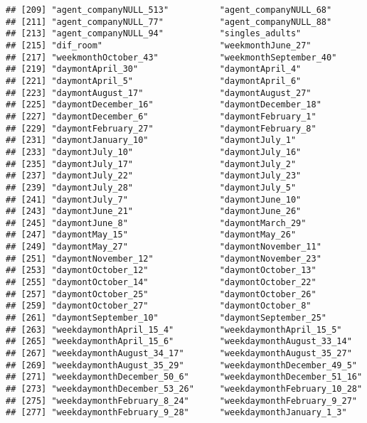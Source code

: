 \documentclass[
]{book}
\begin{document}
\begin{verbatim}
## [209] "agent_companyNULL_513"          "agent_companyNULL_68"          
## [211] "agent_companyNULL_77"           "agent_companyNULL_88"          
## [213] "agent_companyNULL_94"           "singles_adults"                
## [215] "dif_room"                       "weekmonthJune_27"              
## [217] "weekmonthOctober_43"            "weekmonthSeptember_40"         
## [219] "daymontApril_30"                "daymontApril_4"                
## [221] "daymontApril_5"                 "daymontApril_6"                
## [223] "daymontAugust_17"               "daymontAugust_27"              
## [225] "daymontDecember_16"             "daymontDecember_18"            
## [227] "daymontDecember_6"              "daymontFebruary_1"             
## [229] "daymontFebruary_27"             "daymontFebruary_8"             
## [231] "daymontJanuary_10"              "daymontJuly_1"                 
## [233] "daymontJuly_10"                 "daymontJuly_16"                
## [235] "daymontJuly_17"                 "daymontJuly_2"                 
## [237] "daymontJuly_22"                 "daymontJuly_23"                
## [239] "daymontJuly_28"                 "daymontJuly_5"                 
## [241] "daymontJuly_7"                  "daymontJune_10"                
## [243] "daymontJune_21"                 "daymontJune_26"                
## [245] "daymontJune_8"                  "daymontMarch_29"               
## [247] "daymontMay_15"                  "daymontMay_26"                 
## [249] "daymontMay_27"                  "daymontNovember_11"            
## [251] "daymontNovember_12"             "daymontNovember_23"            
## [253] "daymontOctober_12"              "daymontOctober_13"             
## [255] "daymontOctober_14"              "daymontOctober_22"             
## [257] "daymontOctober_25"              "daymontOctober_26"             
## [259] "daymontOctober_27"              "daymontOctober_8"              
## [261] "daymontSeptember_10"            "daymontSeptember_25"           
## [263] "weekdaymonthApril_15_4"         "weekdaymonthApril_15_5"        
## [265] "weekdaymonthApril_15_6"         "weekdaymonthAugust_33_14"      
## [267] "weekdaymonthAugust_34_17"       "weekdaymonthAugust_35_27"      
## [269] "weekdaymonthAugust_35_29"       "weekdaymonthDecember_49_5"     
## [271] "weekdaymonthDecember_50_6"      "weekdaymonthDecember_51_16"    
## [273] "weekdaymonthDecember_53_26"     "weekdaymonthFebruary_10_28"    
## [275] "weekdaymonthFebruary_8_24"      "weekdaymonthFebruary_9_27"     
## [277] "weekdaymonthFebruary_9_28"      "weekdaymonthJanuary_1_3"       

\end{verbatim}
\end{document}
